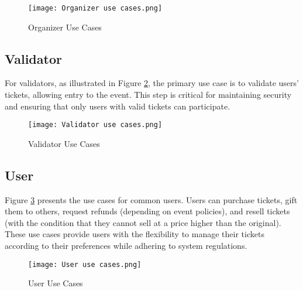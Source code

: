 \begin{figure}[H]
    \centering
    \texttt{[image: Organizer use cases.png]}
    \caption{Organizer Use Cases}
    \label{fig:organizer_use_cases}
\end{figure}

\subsection{Validator}
\label{subsec:validator}

For validators, as illustrated in Figure \ref{fig:validator_use_cases}, the
primary use case is to validate users' tickets, allowing entry to the event.
This step is critical for maintaining security and ensuring that only users
with valid tickets can participate.

\begin{figure}[H]
    \centering
    \texttt{[image: Validator use cases.png]}
    \caption{Validator Use Cases}
    \label{fig:validator_use_cases}
\end{figure}

\subsection{User}
\label{subsec:user}

Figure \ref{fig:user_use_cases} presents the use cases for common users. Users
can purchase tickets, gift them to others, request refunds (depending on event
policies), and resell tickets (with the condition that they cannot sell at a
price higher than the original). These use cases provide users with the
flexibility to manage their tickets according to their preferences while
adhering to system regulations.

\begin{figure}[H]
    \centering
    \texttt{[image: User use cases.png]}
    \caption{User Use Cases}
    \label{fig:user_use_cases}
\end{figure}
